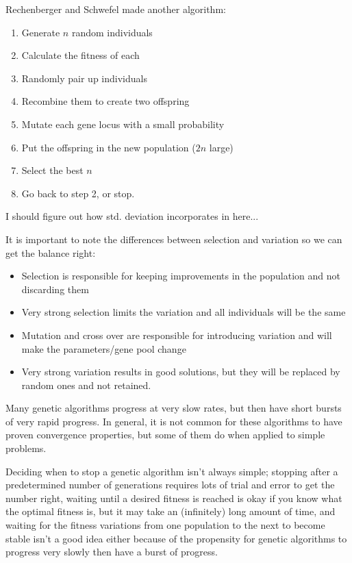 Rechenberger and Schwefel made another algorithm:

\begin{enumerate}
  \item Generate $n$ random individuals
  \item Calculate the fitness of each
  \item Randomly pair up individuals
  \item Recombine them to create two offspring
  \item Mutate each gene locus with a small probability
  \item Put the offspring in the new population ($2n$ large)
  \item Select the best $n$
  \item Go back to step 2, or stop.
\end{enumerate}


I should figure out how std. deviation incorporates in here...

It is important to note the differences between selection and variation so we
can get the balance right:

\begin{itemize}
  \item Selection is responsible for keeping improvements in the population and
  not discarding them
  \item Very strong selection limits the variation and all individuals will be 
  the same
  \item Mutation and cross over are responsible for introducing variation and 
  will make the parameters/gene pool change
  \item Very strong variation results in good solutions, but they will be 
  replaced by random ones and not retained.
\end{itemize}

Many genetic algorithms progress at very slow rates, but then have short bursts
of very rapid progress. In general, it is not common for these algorithms to
have proven convergence properties, but some of them do when applied to simple
problems.


Deciding when to stop a genetic algorithm isn't always simple; stopping after a
predetermined number of generations requires lots of trial and error to get the
number right, waiting until a desired fitness is reached is okay if you know
what the optimal fitness is, but it may take an (infinitely) long amount of
time, and waiting for the fitness variations from one population to the next to
become stable isn't a good idea either because of the propensity for genetic
algorithms to progress very slowly then have a burst of progress.

